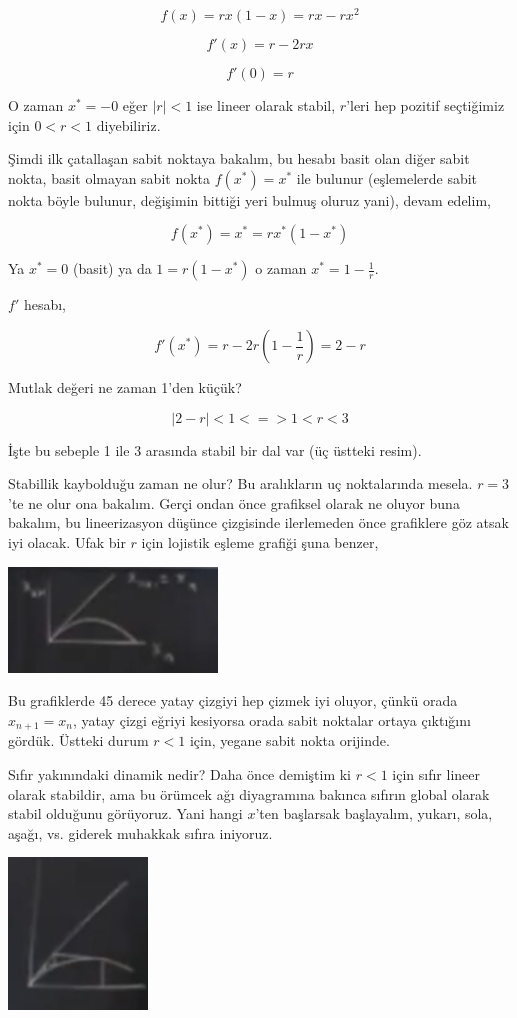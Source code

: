\documentclass[12pt,fleqn]{article}\usepackage{../../common}
\begin{document}
$$ f(x) =  r x (1-x) = rx - rx^2$$

$$ f'(x) = r - 2rx$$

$$ f'(0) = r$$

O zaman $x^*=-0$ eğer $|r|<1$ ise lineer olarak stabil, $r$'leri hep
pozitif seçtiğimiz için $0 < r <1$ diyebiliriz.

Şimdi ilk çatallaşan sabit noktaya bakalım, bu hesabı basit olan diğer
sabit nokta, basit olmayan sabit nokta $f(x^*) = x^*$ ile bulunur
(eşlemelerde sabit nokta böyle bulunur, değişimin bittiği yeri bulmuş
oluruz yani), devam edelim,

$$ f(x^*) = x^* = rx^*(1-x^*)$$

Ya $x^*=0$ (basit) ya da $1=r(1-x^*)$ o zaman $x^* = 1-\frac{1}{r}$. 

$f'$ hesabı, 

$$ f'(x^*) = r-2r \left(1-\frac{1}{r} \right) = 2-r$$

Mutlak değeri ne zaman 1'den küçük?

$$  | 2-r | < 1 <=> 1 < r < 3 $$

İşte bu sebeple 1 ile 3 arasında stabil bir dal var (üç üstteki resim). 

Stabillik kaybolduğu zaman ne olur? Bu aralıkların uç noktalarında
mesela. $r=3$'te ne olur ona bakalım. Gerçi ondan önce grafiksel olarak ne
oluyor buna bakalım, bu lineerizasyon düşünce çizgisinde ilerlemeden önce
grafiklere göz atsak iyi olacak. Ufak bir $r$ için lojistik eşleme grafiği
şuna benzer,

\includegraphics[width=15em]{19_10.png}
 
Bu grafiklerde 45 derece yatay çizgiyi hep çizmek iyi oluyor, çünkü orada
$x_{n+1} = x_n$, yatay çizgi eğriyi kesiyorsa orada sabit noktalar ortaya
çıktığını gördük. Üstteki durum $r<1$ için, yegane sabit nokta orijinde.

Sıfır yakınındaki dinamik nedir? Daha önce demiştim ki $r<1$ için sıfır
lineer olarak stabildir, ama bu örümcek ağı diyagramına bakınca sıfırın
global olarak stabil olduğunu görüyoruz. Yani hangi $x$'ten başlarsak
başlayalım, yukarı, sola, aşağı, vs. giderek muhakkak sıfıra iniyoruz.

\includegraphics[width=10em]{19_11.png}
 
\end{document}
